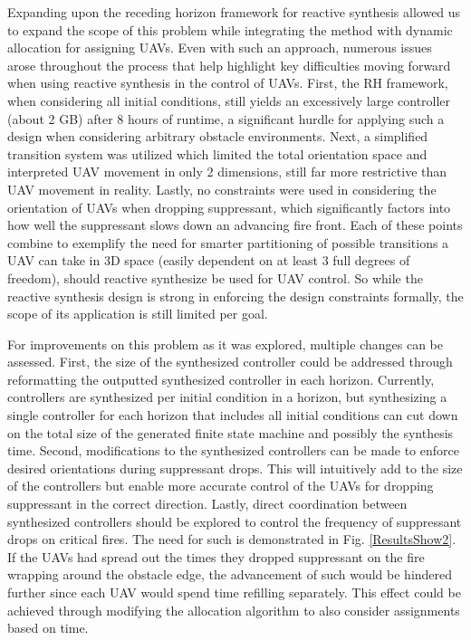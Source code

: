 \documentclass{ieeeaccess}
\begin{document}
Expanding upon the receding horizon framework for reactive synthesis allowed us to expand the scope of this problem while integrating the method with dynamic allocation for assigning UAVs. Even with such an approach, numerous issues arose throughout the process that help highlight key difficulties moving forward when using reactive synthesis in the control of UAVs. First, the RH framework, when considering all initial conditions, still yields an excessively large controller (about 2 GB) after 8 hours of runtime, a significant hurdle for applying such a design when considering arbitrary obstacle environments. Next, a simplified transition system was utilized which limited the total orientation space and interpreted UAV movement in only 2 dimensions, still far more restrictive than UAV movement in reality. Lastly, no constraints were used in considering the orientation of UAVs when dropping suppressant, which significantly factors into how well the suppressant slows down an advancing fire front. Each of these points combine to exemplify the need for smarter partitioning of possible transitions a UAV can take in 3D space (easily dependent on at least 3 full degrees of freedom), should reactive synthesize be used for UAV control. So while the reactive synthesis design is strong in enforcing the design constraints formally, the scope of its application is still limited per goal.

For improvements on this problem as it was explored, multiple changes can be assessed. First, the size of the synthesized controller could be addressed through reformatting the outputted synthesized controller in each horizon. Currently, controllers are synthesized per initial condition in a horizon, but synthesizing a single controller for each horizon that includes all initial conditions can cut down on the total size of the generated finite state machine and possibly the synthesis time. Second, modifications to the synthesized controllers can be made to enforce desired orientations during suppressant drops. This will intuitively add to the size of the controllers but enable more accurate control of the UAVs for dropping suppressant in the correct direction. Lastly, direct coordination between synthesized controllers should be explored to control the frequency of suppressant drops on critical fires. The need for such is demonstrated in Fig. \ref{ResultsShow2}. If the UAVs had spread out the times they dropped suppressant on the fire wrapping around the obstacle edge, the advancement of such would be hindered further since each UAV would spend time refilling separately. This effect could be achieved through modifying the allocation algorithm to also consider assignments based on time. 
\end{document}
